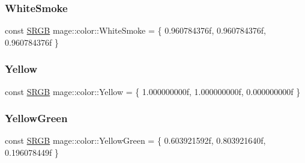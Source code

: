 \subsubsection{\texorpdfstring{White\+Smoke}{WhiteSmoke}}
{\footnotesize\ttfamily const \hyperlink{structmage_1_1_s_r_g_b}{S\+R\+GB} mage\+::color\+::\+White\+Smoke = \{ 0.\+960784376f, 0.\+960784376f, 0.\+960784376f \}}

\hypertarget{namespacemage_1_1color_a7dd7634c14fe1917cfe6de0c6f0427f0}{}\label{namespacemage_1_1color_a7dd7634c14fe1917cfe6de0c6f0427f0} 
\subsubsection{\texorpdfstring{Yellow}{Yellow}}
{\footnotesize\ttfamily const \hyperlink{structmage_1_1_s_r_g_b}{S\+R\+GB} mage\+::color\+::\+Yellow = \{ 1.\+000000000f, 1.\+000000000f, 0.\+000000000f \}}

\hypertarget{namespacemage_1_1color_ab45afdafcda7e512b8b560f318098d78}{}\label{namespacemage_1_1color_ab45afdafcda7e512b8b560f318098d78} 
\subsubsection{\texorpdfstring{Yellow\+Green}{YellowGreen}}
{\footnotesize\ttfamily const \hyperlink{structmage_1_1_s_r_g_b}{S\+R\+GB} mage\+::color\+::\+Yellow\+Green = \{ 0.\+603921592f, 0.\+803921640f, 0.\+196078449f \}}

